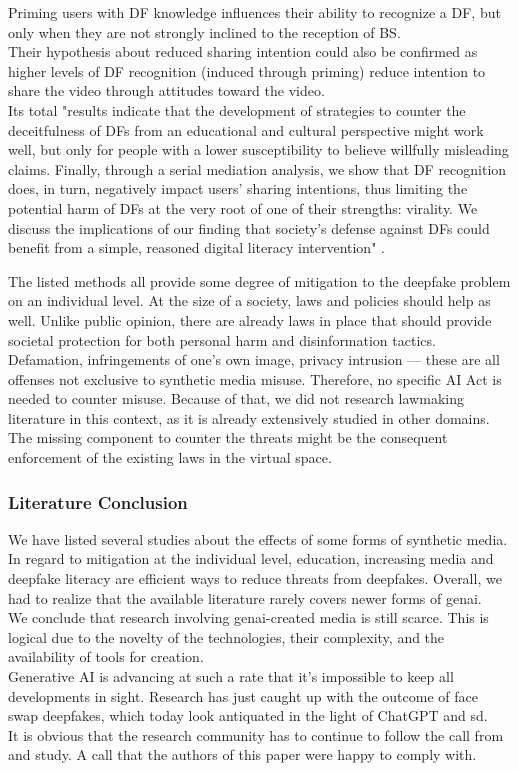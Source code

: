 \documentclass[
  a4paper,  %
  twoside,  %
  bibliography=totoc,
  headsepline,
  cleardoublepage=empty,
  parskip=half,
  draft=false
]{scrbook}
\begin{document}
Priming users with DF knowledge influences their ability to recognize a DF, but only when they are not strongly inclined to the reception of BS. \\
Their hypothesis about reduced sharing intention could also be confirmed as higher levels of DF recognition (induced through priming) reduce intention to share the video through attitudes toward the video. \\
Its total "results indicate that the development of strategies to counter the deceitfulness of DFs from an educational and cultural perspective might work well, but only for people with a lower susceptibility to believe willfully misleading claims. Finally, through a serial mediation analysis, we show that DF recognition does, in turn, negatively impact users' sharing intentions, thus limiting the potential harm of DFs at the very root of one of their strengths: virality. We discuss the implications of our finding that society's defense against DFs could benefit from a simple, reasoned digital literacy intervention" \cite{iacobucciDeepfakesUnmaskedEffects2021}.

The listed methods all provide some degree of mitigation to the deepfake problem on an individual level. At the size of a society, laws and policies should help as well. Unlike public opinion, there are already laws in place that should provide societal protection for both personal harm and disinformation tactics. Defamation, infringements of one's own image, privacy intrusion — these are all offenses not exclusive to synthetic media misuse. Therefore, no specific AI Act is needed to counter misuse. Because of that, we did not research lawmaking literature in this context, as it is already extensively studied in other domains. The missing component to counter the threats might be the consequent enforcement of the existing laws in the virtual space. 

\subsubsection*{Literature Conclusion}
We have listed several studies about the effects of some forms of synthetic media. In regard to mitigation at the individual level, education, increasing media and deepfake literacy are efficient ways to reduce threats from deepfakes. Overall, we had to realize that the available literature rarely covers newer forms of \gls{genai}. \\
We conclude that research involving \gls{genai}-created media is still scarce. This is logical due to the novelty of the technologies, their complexity, and the availability of tools for creation. \\
Generative AI is advancing at such a rate that it's impossible to keep all developments in sight. Research has just caught up with the outcome of face swap deepfakes, which today look antiquated in the light of ChatGPT and \gls{sd}. \\
It is obvious that the research community has to continue to follow the call from \citet{hancockSocialImpactDeepfakes2021} and study. A call that the authors of this paper were happy to comply with.
\end{document}
